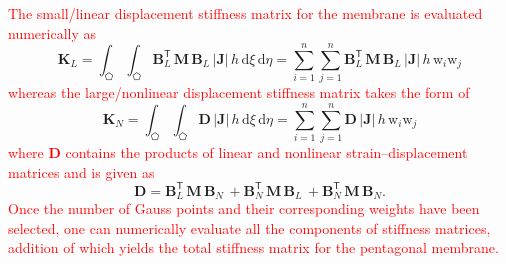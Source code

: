 \textcolor{red}{The small/linear displacement stiffness matrix for the membrane is evaluated numerically as} 
\begin{equation}
\mathbf{K}_{L} = \int_{\pentagon} \int_{\pentagon} \mathbf{B}_L^{\mathsf{T}} \, \mathbf{M} \, \mathbf{B}_L \, |\mathbf{J}| \, h \,  \mathrm{d} \xi \,  \mathrm{d} \eta =  \sum_{i=1}^{n} \sum_{j=1}^{n} \mathbf{B}_L^{\mathsf{T}} \, \mathbf{M} \, \mathbf{B}_L \, |\mathbf{J}|  \, h \, \mathrm{w}_i \mathrm{w}_j
\end{equation}
\textcolor{red}{whereas the large/nonlinear displacement stiffness matrix takes the form of}
\begin{equation}
\mathbf{K}_{N} = \int_{\pentagon} \int_{\pentagon} \mathbf{D} \, |\mathbf{J}|\, h \, \mathrm{d} \xi \, \mathrm{d} \eta 
= \sum_{i=1}^{n} \sum_{j=1}^{n} \mathbf{D} \, |\mathbf{J}| \, h \, \mathrm{w}_i \mathrm{w}_j
\end{equation}
\textcolor{red}{where $\mathbf{D}$ contains the products of linear and nonlinear strain--displacement matrices and is given as} 
\begin{equation}
\mathbf{D} = \mathbf{B}_L^{\mathsf{T}} \, \mathbf{M} \, \mathbf{B}_N \, + \mathbf{B}_N^{\mathsf{T}} \, \mathbf{M} \, \mathbf{B}_L \, + \mathbf{B}_N^{\mathsf{T}} \, \mathbf{M} \, \mathbf{B}_N.
\end{equation}
\textcolor{red}{Once the number of Gauss points and their corresponding weights have been selected, one can numerically evaluate all the components of stiffness matrices, addition of which yields the total stiffness matrix for the pentagonal membrane.}


